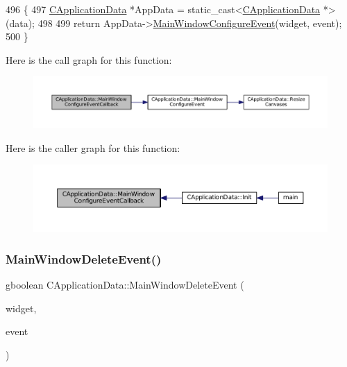 \begin{DoxyCode}
496                                                                                                            
       \{
497     \hyperlink{classCApplicationData}{CApplicationData} *AppData = \textcolor{keyword}{static\_cast<}\hyperlink{classCApplicationData}{CApplicationData} *\textcolor{keyword}{>}(data);
498 
499     \textcolor{keywordflow}{return} AppData->\hyperlink{classCApplicationData_a7abef8a548d0ad3adb70f11d8a74176c}{MainWindowConfigureEvent}(widget, event);
500 \}
\end{DoxyCode}
Here is the call graph for this function\+:\nopagebreak
\begin{figure}[H]
\begin{center}
\leavevmode
\includegraphics[width=350pt]{classCApplicationData_a31b48405b43d73cabca4c080c1b9beee_cgraph}
\end{center}
\end{figure}
Here is the caller graph for this function\+:\nopagebreak
\begin{figure}[H]
\begin{center}
\leavevmode
\includegraphics[width=350pt]{classCApplicationData_a31b48405b43d73cabca4c080c1b9beee_icgraph}
\end{center}
\end{figure}
\hypertarget{classCApplicationData_afd73780d7dca117edbe341cb3c908c04}{}\label{classCApplicationData_afd73780d7dca117edbe341cb3c908c04} 
\subsubsection{\texorpdfstring{Main\+Window\+Delete\+Event()}{MainWindowDeleteEvent()}}
{\footnotesize\ttfamily gboolean C\+Application\+Data\+::\+Main\+Window\+Delete\+Event (\begin{DoxyParamCaption}\item[{Gtk\+Widget $\ast$}]{widget,  }\item[{Gdk\+Event $\ast$}]{event }\end{DoxyParamCaption})\hspace{0.3cm}{\ttfamily [protected]}}



